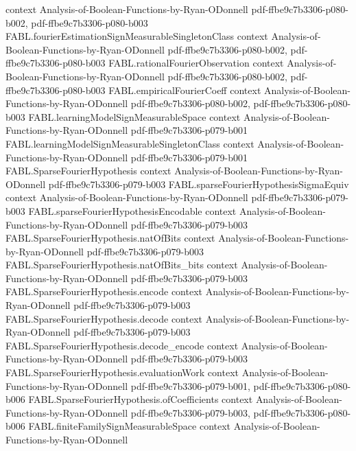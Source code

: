 \begin{theorem}
  {context}
  {Analysis-of-Boolean-Functions-by-Ryan-ODonnell}
  {pdf-ffbe9c7b3306-p080-b002,
    pdf-ffbe9c7b3306-p080-b003}
\proofstep
  {FABL.fourierEstimationSignMeasurableSingletonClass}
  {context}
  {Analysis-of-Boolean-Functions-by-Ryan-ODonnell}
  {pdf-ffbe9c7b3306-p080-b002,
    pdf-ffbe9c7b3306-p080-b003}
\proofstep
  {FABL.rationalFourierObservation}
  {context}
  {Analysis-of-Boolean-Functions-by-Ryan-ODonnell}
  {pdf-ffbe9c7b3306-p080-b002,
    pdf-ffbe9c7b3306-p080-b003}
\proofstep
  {FABL.empiricalFourierCoeff}
  {context}
  {Analysis-of-Boolean-Functions-by-Ryan-ODonnell}
  {pdf-ffbe9c7b3306-p080-b002,
    pdf-ffbe9c7b3306-p080-b003}
\proofstep
  {FABL.learningModelSignMeasurableSpace}
  {context}
  {Analysis-of-Boolean-Functions-by-Ryan-ODonnell}
  {pdf-ffbe9c7b3306-p079-b001}
\proofstep
  {FABL.learningModelSignMeasurableSingletonClass}
  {context}
  {Analysis-of-Boolean-Functions-by-Ryan-ODonnell}
  {pdf-ffbe9c7b3306-p079-b001}
\proofstep
  {FABL.SparseFourierHypothesis}
  {context}
  {Analysis-of-Boolean-Functions-by-Ryan-ODonnell}
  {pdf-ffbe9c7b3306-p079-b003}
\proofstep
  {FABL.sparseFourierHypothesisSigmaEquiv}
  {context}
  {Analysis-of-Boolean-Functions-by-Ryan-ODonnell}
  {pdf-ffbe9c7b3306-p079-b003}
\proofstep
  {FABL.sparseFourierHypothesisEncodable}
  {context}
  {Analysis-of-Boolean-Functions-by-Ryan-ODonnell}
  {pdf-ffbe9c7b3306-p079-b003}
\proofstep
  {FABL.SparseFourierHypothesis.natOfBits}
  {context}
  {Analysis-of-Boolean-Functions-by-Ryan-ODonnell}
  {pdf-ffbe9c7b3306-p079-b003}
\proofstep
  {FABL.SparseFourierHypothesis.natOfBits_bits}
  {context}
  {Analysis-of-Boolean-Functions-by-Ryan-ODonnell}
  {pdf-ffbe9c7b3306-p079-b003}
\proofstep
  {FABL.SparseFourierHypothesis.encode}
  {context}
  {Analysis-of-Boolean-Functions-by-Ryan-ODonnell}
  {pdf-ffbe9c7b3306-p079-b003}
\proofstep
  {FABL.SparseFourierHypothesis.decode}
  {context}
  {Analysis-of-Boolean-Functions-by-Ryan-ODonnell}
  {pdf-ffbe9c7b3306-p079-b003}
\proofstep
  {FABL.SparseFourierHypothesis.decode_encode}
  {context}
  {Analysis-of-Boolean-Functions-by-Ryan-ODonnell}
  {pdf-ffbe9c7b3306-p079-b003}
\proofstep
  {FABL.SparseFourierHypothesis.evaluationWork}
  {context}
  {Analysis-of-Boolean-Functions-by-Ryan-ODonnell}
  {pdf-ffbe9c7b3306-p079-b001,
    pdf-ffbe9c7b3306-p080-b006}
\proofstep
  {FABL.SparseFourierHypothesis.ofCoefficients}
  {context}
  {Analysis-of-Boolean-Functions-by-Ryan-ODonnell}
  {pdf-ffbe9c7b3306-p079-b003,
    pdf-ffbe9c7b3306-p080-b006}
\proofstep
  {FABL.finiteFamilySignMeasurableSpace}
  {context}
  {Analysis-of-Boolean-Functions-by-Ryan-ODonnell}

\end{theorem}
